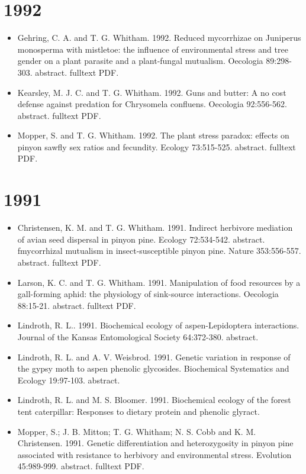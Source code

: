 \documentclass[12pt]{article}
\begin{document}
\section{1992}
\begin{itemize}
\item Gehring, C. A. and T. G. Whitham. 1992. Reduced mycorrhizae on
Juniperus monosperma with mistletoe: the influence of environmental
stress and tree gender on a plant parasite and a plant-fungal
mutualism. Oecologia 89:298-303. abstract. fulltext PDF.
 
\item Kearsley, M. J. C. and T. G. Whitham. 1992. Guns and butter: A no cost
defense against predation for Chrysomela confluens. Oecologia
92:556-562. abstract. fulltext PDF.
 
\item Mopper, S. and T. G. Whitham. 1992. The plant stress paradox: effects
on pinyon sawfly sex ratios and fecundity. Ecology
73:515-525. abstract. fulltext PDF.
 
\end{itemize}

\section{1991}
\begin{itemize}
\item Christensen, K. M. and T. G. Whitham. 1991. Indirect herbivore
mediation of avian seed dispersal in pinyon pine. Ecology
72:534-542. abstract. fmycorrhizal mutualism in insect-susceptible
pinyon pine. Nature 353:556-557. abstract. fulltext PDF.
 
\item Larson, K. C. and T. G. Whitham. 1991. Manipulation of food resources
by a gall-forming aphid: the physiology of sink-source
interactions. Oecologia 88:15-21. abstract. fulltext PDF.
 
\item Lindroth, R. L.. 1991. Biochemical ecology of aspen-Lepidoptera
interactions. Journal of the Kansas Entomological Society
64:372-380. abstract.
 
\item Lindroth, R. L. and A. V. Weisbrod. 1991. Genetic variation in
response of the gypsy moth to aspen phenolic glycosides. Biochemical
Systematics and Ecology 19:97-103. abstract.
 
\item Lindroth, R. L. and M. S. Bloomer. 1991. Biochemical ecology of the
forest tent caterpillar: Responses to dietary protein and phenolic
glyract.
 
\item Mopper, S.; J. B. Mitton; T. G. Whitham; N. S. Cobb and
K. M. Christensen. 1991. Genetic differentiation and heterozygosity in
pinyon pine associated with resistance to herbivory and environmental
stress. Evolution 45:989-999. abstract. fulltext PDF.
 
\end{itemize}
\end{document}

